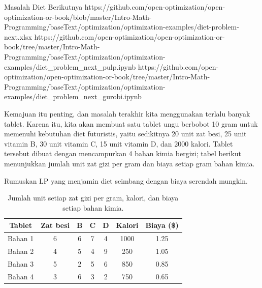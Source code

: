 
\begin{examplewithallcode}{Masalah Diet Berikutnya}
{https://github.com/open-optimization/open-optimization-or-book/blob/master/Intro-Math-Programming/baseText/optimization/optimization-examples/diet-problem-next.xlsx}
{https://github.com/open-optimization/open-optimization-or-book/tree/master/Intro-Math-Programming/baseText/optimization/optimization-examples/diet_problem_next_pulp.ipynb}
{https://github.com/open-optimization/open-optimization-or-book/tree/master/Intro-Math-Programming/baseText/optimization/optimization-examples/diet_problem_next_gurobi.ipynb}

Kemajuan itu penting, dan masalah terakhir kita menggunakan terlalu banyak tablet. Karena itu, kita akan membuat satu tablet ungu berbobot 10 gram untuk memenuhi kebutuhan diet futuristis, yaitu sedikitnya 20 unit zat besi, 25 unit vitamin B, 30 unit vitamin C, 15 unit vitamin D, dan 2000 kalori. Tablet tersebut dibuat dengan mencampurkan 4 bahan kimia bergizi; tabel berikut menunjukkan jumlah unit zat gizi per gram dan biaya setiap gram bahan kimia.

Rumuskan LP yang menjamin diet seimbang dengan biaya serendah mungkin.
\end{examplewithallcode}

\begin{table}[h!] \begin{center} \begin{tabular} {|c|c|c|c|c|c|c|}
\hline Tablet  & Zat besi  &  B &  C &  D & Kalori & Biaya (\$) \\ \hline
\hline  Bahan 1  & 6    & 6         & 7         & 4         &  1000    & 1.25 \\
\hline  Bahan 2  & 4    & 5         & 4         & 9         &  250     & 1.05 \\
\hline  Bahan 3  & 5    & 2         & 5         & 6         &  850     & 0.85 \\
\hline  Bahan 4  & 3    & 6         & 3         & 2         &  750     & 0.65 \\
\hline
\end{tabular} \end{center} \caption{Jumlah unit setiap zat gizi per gram, kalori, dan biaya setiap bahan kimia.}\label{tab:modeling-linear-programming-tab02}%
\end{table}

